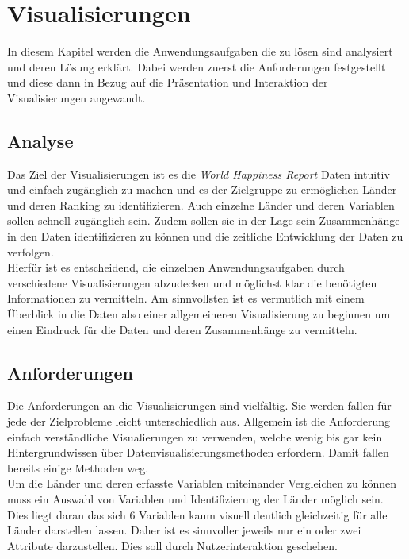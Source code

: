 \section{Visualisierungen}
In diesem Kapitel werden die Anwendungsaufgaben die zu lösen sind analysiert und deren Lösung erklärt. Dabei werden zuerst die Anforderungen festgestellt und diese dann in Bezug auf die Präsentation und Interaktion der Visualisierungen angewandt.  

\subsection{Analyse}

Das Ziel der Visualisierungen ist es die \textit{World Happiness Report} Daten intuitiv und einfach zugänglich zu machen und es der Zielgruppe zu ermöglichen Länder und deren Ranking zu identifizieren. Auch einzelne Länder und deren Variablen sollen schnell zugänglich sein. Zudem sollen sie in der Lage sein Zusammenhänge in den Daten identifizieren zu können und die zeitliche Entwicklung der Daten zu verfolgen. \\

Hierfür ist es entscheidend, die einzelnen Anwendungsaufgaben durch verschiedene Visualisierungen abzudecken und möglichst klar die benötigten Informationen zu vermitteln. 
Am sinnvollsten ist es vermutlich mit einem Überblick in die Daten also einer allgemeineren Visualisierung zu beginnen um einen Eindruck für die Daten und deren Zusammenhänge zu vermitteln. \\

\subsection{Anforderungen}
Die Anforderungen an die Visualisierungen sind vielfältig. Sie werden fallen für jede der Zielprobleme leicht unterschiedlich aus. Allgemein ist die Anforderung einfach verständliche Visualierungen zu verwenden, welche wenig bis gar kein Hintergrundwissen über Datenvisualisierungsmethoden erfordern. Damit fallen bereits einige Methoden weg. \\

Um die Länder und deren erfasste Variablen miteinander Vergleichen zu können muss ein Auswahl von Variablen und Identifizierung der Länder möglich sein. Dies liegt daran das sich 6 Variablen kaum visuell deutlich gleichzeitig für alle Länder darstellen lassen. Daher ist es sinnvoller jeweils nur ein oder zwei Attribute darzustellen. Dies soll durch Nutzerinteraktion geschehen. \\

